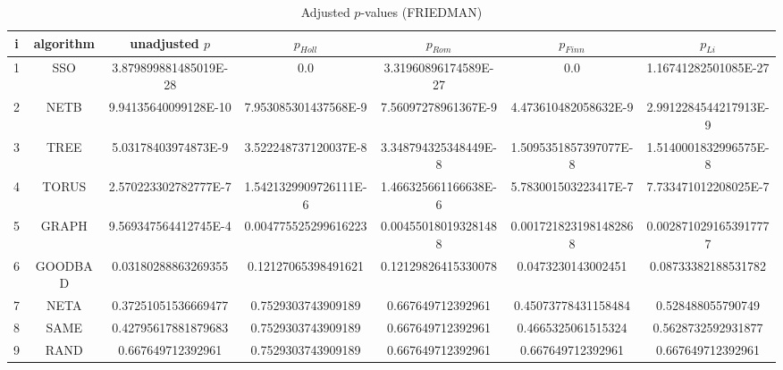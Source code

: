 \documentclass[a4paper,10pt]{article}
\begin{document}
\begin{landscape}
\begin{table}[!htp]
\centering\scriptsize
\caption{Adjusted $p$-values (FRIEDMAN)}
\begin{tabular}{ccccccc}
i&algorithm&unadjusted $p$&$p_{Holl}$&$p_{Rom}$&$p_{Finn}$&$p_{Li}$\\
\hline
1& SSO&3.879899881485019E-28&0.0&3.31960896174589E-27&0.0&1.16741282501085E-27\\
2& NETB&9.94135640099128E-10&7.953085301437568E-9&7.56097278961367E-9&4.473610482058632E-9&2.9912284544217913E-9\\
3& TREE&5.03178403974873E-9&3.522248737120037E-8&3.348794325348449E-8&1.5095351857397077E-8&1.5140001832996575E-8\\
4& TORUS&2.570223302782777E-7&1.5421329909726111E-6&1.466325661166638E-6&5.783001503223417E-7&7.733471012208025E-7\\
5& GRAPH&9.569347564412745E-4&0.004775525299616223&0.004550180193281488&0.0017218231981482868&0.0028710291653917777\\
6& GOODBAD&0.03180288863269355&0.12127065398491621&0.12129826415330078&0.0473230143002451&0.08733382188531782\\
7& NETA&0.37251051536669477&0.7529303743909189&0.667649712392961&0.45073778431158484&0.528488055790749\\
8& SAME&0.42795617881879683&0.7529303743909189&0.667649712392961&0.4665325061515324&0.5628732592931877\\
9& RAND&0.667649712392961&0.7529303743909189&0.667649712392961&0.667649712392961&0.667649712392961\\
\hline
\end{tabular}
\end{table}


\newpage


\end{landscape}
\end{document}
